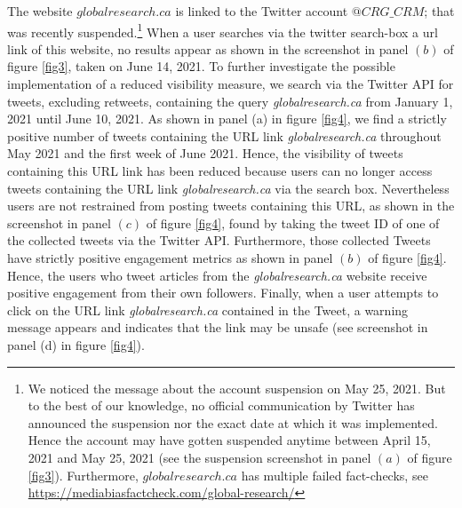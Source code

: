 \documentclass[11pt,a4paper]{article}
\begin{document}
The website $globalresearch.ca$ is linked to the Twitter account {$@CRG\_CRM$}; that was recently suspended.\footnote{We noticed the message about the account suspension on May 25, 2021. But to the best of our knowledge, no official communication by Twitter has announced the suspension nor the exact date at which it was implemented. Hence the account may have gotten suspended anytime between April 15, 2021 and May 25, 2021 (see the suspension screenshot in panel $(a)$ of figure \ref{fig3}). Furthermore, $globalresearch.ca$ has multiple failed fact-checks, see \href{https://mediabiasfactcheck.com/global-research/}{https://mediabiasfactcheck.com/global-research/}} When a user searches via the twitter search-box a url link of this website, no results appear as shown in the screenshot in panel $(b)$ of figure \ref{fig3}, taken on June 14, 2021. To further investigate the possible implementation of a reduced visibility measure, we search via the Twitter API for tweets, excluding retweets, containing the query {\it globalresearch.ca} from January 1, 2021 until June 10, 2021.  As shown in panel (a) in figure \ref{fig4}, we find a strictly positive number of tweets containing the URL link {\it globalresearch.ca} throughout May 2021 and the first week of June 2021. Hence, the visibility of tweets containing this URL link has been reduced because users can no longer access tweets containing the URL link {\it globalresearch.ca} via the search box. Nevertheless users are not restrained from posting tweets containing this URL, as shown in the screenshot in panel $(c)$
 of figure \ref{fig4}, found by taking the tweet ID of one of the collected tweets via the Twitter API. Furthermore, those collected Tweets have strictly positive engagement metrics as shown in panel $(b)$ of figure \ref{fig4}. Hence, the users who tweet articles from the {\it globalresearch.ca} website receive positive engagement from their own followers. Finally, when a user attempts to click on the URL link {\it globalresearch.ca} contained in the Tweet, a warning message appears and indicates that the link may be unsafe (see screenshot in panel (d) in figure \ref{fig4}). 




\end{document}
